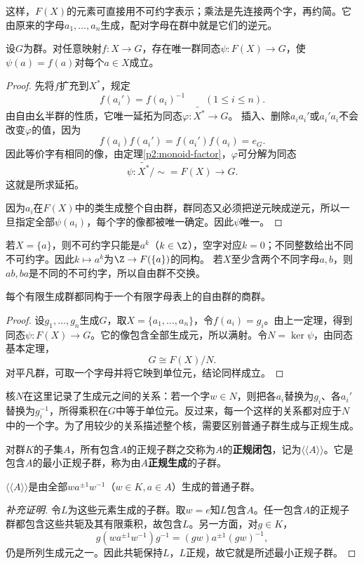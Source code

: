 这样，$F(X)$的元素可直接用不可约字表示；乘法是先连接两个字，再约简。它由原来的字母$a_1,\ldots,a_n$生成，配对字母在群中就是它们的逆元。

\begin{theorem}\label{p2:free-universal}
设$G$为群。对任意映射$f:X\to G$，存在唯一群同态$\psi:F(X)\to G$，使$\psi(a)=f(a)$对每个$a\in X$成立。
\end{theorem}
\begin{proof}
先将$f$扩充到$X^*$，规定
\[
f(a_i')=f(a_i)^{-1}\qquad(1\leq i\leq n).
\]
由自由幺半群的性质，它唯一延拓为同态$\varphi:\widetilde{X^*}\to G$。
插入、删除$a_ia_i'$或$a_i'a_i$不会改变$\varphi$的值，因为
\[
f(a_i)f(a_i')=f(a_i')f(a_i)=e_G.
\]
因此等价字有相同的像，由定理\ref{p2:monoid-factor}，$\varphi$可分解为同态
\[
\psi:\widetilde{X^*}/{\sim}=F(X)\longrightarrow G.
\]
这就是所求延拓。

因为$a_i$在$F(X)$中的类生成整个自由群，群同态又必须把逆元映成逆元，所以一旦指定全部$\psi(a_i)$，每个字的像都被唯一确定。因此$\psi$唯一。
\end{proof}

\begin{example}
若$X=\{a\}$，则不可约字只能是$a^k$（$k\in\Z$），空字对应$k=0$；不同整数给出不同不可约字。因此$k\mapsto a^k$为$\Z\to F(\{a\})$的同构。
若$X$至少含两个不同字母$a,b$，则$ab,ba$是不同的不可约字，所以自由群不交换。
\end{example}

\begin{corollary}
每个有限生成群都同构于一个有限字母表上的自由群的商群。
\end{corollary}
\begin{proof}
设$g_1,\ldots,g_n$生成$G$，取$X=\{a_1,\ldots,a_n\}$，令$f(a_i)=g_i$。由上一定理，得到同态$\psi:F(X)\to G$。它的像包含全部生成元，所以满射。令$N=\ker\psi$，由同态基本定理，
\[
G\cong F(X)/N.
\]
对平凡群，可取一个字母并将它映到单位元，结论同样成立。
\end{proof}

核$N$在这里记录了生成元之间的关系：若一个字$w\in N$，则把各$a_i$替换为$g_i$、各$a_i'$替换为$g_i^{-1}$，所得乘积在$G$中等于单位元。反过来，每一个这样的关系都对应于$N$中的一个字。为了用较少的关系描述整个核，需要区别普通子群生成与正规生成。

\begin{definition}
对群$K$的子集$A$，所有包含$A$的正规子群之交称为$A$的\textbf{正规闭包}，记为$\langle\!\langle A\rangle\!\rangle$。它是包含$A$的最小正规子群，称为由$A$\textbf{正规生成}的子群。
\end{definition}
\begin{proposition}
$\langle\!\langle A\rangle\!\rangle$是由全部$wa^{\pm1}w^{-1}$（$w\in K,a\in A$）生成的普通子群。
\end{proposition}
\begin{proof}[补充证明]
令$L$为这些元素生成的子群。取$w=e$知$L$包含$A$。任一包含$A$的正规子群都包含这些共轭及其有限乘积，故包含$L$。另一方面，对$g\in K$，
\[
g(wa^{\pm1}w^{-1})g^{-1}=(gw)a^{\pm1}(gw)^{-1},
\]
仍是所列生成元之一。因此共轭保持$L$，$L$正规，故它就是所述最小正规子群。
\end{proof}

